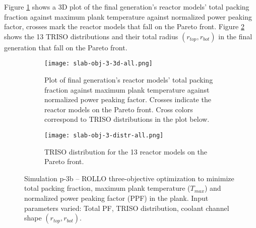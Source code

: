 Figure \ref{fig:slab-obj-3-3d-all} shows a 3D plot of the final generation's reactor 
models' total packing fraction against maximum plank temperature against normalized
power peaking factor, crosses mark the reactor models that fall on the Pareto front.
Figure \ref{fig:slab-obj-3-distr-all} shows the 13 TRISO distributions and their
total radius $(r_{top}, r_{bot})$ in the final generation that fall on the Pareto 
front. 
\begin{figure}[htbp!]
    \begin{subfigure}{\textwidth}
        \centering
        \texttt{[image: slab-obj-3-3d-all.png]}
        \caption{Plot of final generation's reactor models' total packing fraction against maximum plank 
        temperature against normalized power peaking factor. Crosses indicate the reactor models on the 
        Pareto front. Cross colors correspond to TRISO distributions in the plot below.}
        \label{fig:slab-obj-3-3d-all} 
    \end{subfigure}
    \begin{subfigure}{\textwidth}
        \texttt{[image: slab-obj-3-distr-all.png]}
        \caption{TRISO distribution for the 13 reactor models on the Pareto front.}
        \label{fig:slab-obj-3-distr-all} 
    \end{subfigure}
    \caption{Simulation p-3b -- ROLLO three-objective optimization to minimize total packing fraction, 
    maximum plank temperature ($T_{max}$) and normalized power peaking factor (PPF) in the plank. 
    Input parameters varied: Total PF, TRISO distribution, 
    coolant channel shape $(r_{top}, r_{bot})$.}
    \label{fig:slab-obj-3-all}
\end{figure}

